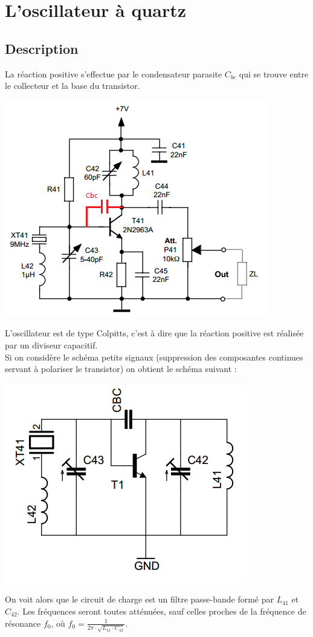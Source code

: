 \documentclass{article}
\begin{document}
\section{L'oscillateur à quartz}

\subsection{Description}

La réaction positive s'effectue par le condensateur parasite $C_{bc}$ qui se trouve entre le collecteur et la base du transistor.
\begin{center}
\includegraphics[width = 0.7\linewidth]{shema_oscillateur.png}
\end{center}
L'oscillateur est de type Colpitts, c'est à dire que la réaction positive est réalisée par un diviseur capacitif.\\
Si on considère le schéma petits signaux (suppression des composantes continues servant à polariser le transistor) on obtient le schéma suivant :
\begin{center}
\includegraphics[width=0.4\linewidth]{shema_petit_signaux_oscillateur.png}
\end{center}
On voit alors que le circuit de charge est un filtre passe-bande formé par $L_{41}$ et $C_{42}$. Les fréquences seront toutes atténuées, sauf celles proches de la fréquence de résonance $f_0$, où $f_0 = \frac{1}{2 \pi \cdot \sqrt{L_{41} \cdot C_{42}}}$.\\
\end{document}
